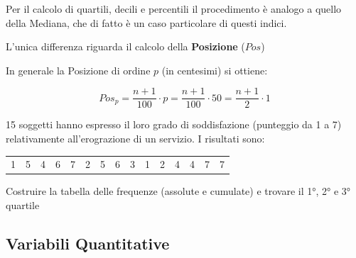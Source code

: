 \documentclass[compress]{beamer}
\begin{document}
\begin{frame}
	Per il calcolo di quartili, decili e percentili il procedimento è
	analogo a quello della Mediana, che di fatto è un caso
	particolare di questi indici.
	
	\vspace{3mm}
	L’unica differenza riguarda il calcolo della \textbf{Posizione} ($Pos$)
	
	In generale la Posizione di ordine $p$ (in centesimi) si ottiene:
	
	\begin{equation*}
		Pos_p = \dfrac{n+1}{100}\cdot p = \dfrac{n+1}{100}\cdot 50 = \dfrac{n+1}{2}\cdot 1
	\end{equation*}
\end{frame}

\begin{frame}

\begin{block}
		
		15 soggetti hanno espresso il loro grado di
		soddisfazione (punteggio da 1 a 7)
		relativamente all’erograzione di un servizio.
		I risultati sono:
		\begin{tabular}{c c c c c c c c c c c c c c c}
				1 & 5& 4& 6& 7& 2& 5 &6 &3 &1 & 2& 4& 4& 7& 7\\
		\end{tabular}

		Costruire la tabella delle frequenze (assolute e cumulate) e trovare il 1°, 2° e 3° quartile
	\end{block}

\end{frame}

\subsection*{Variabili Quantitative}
\end{document}
